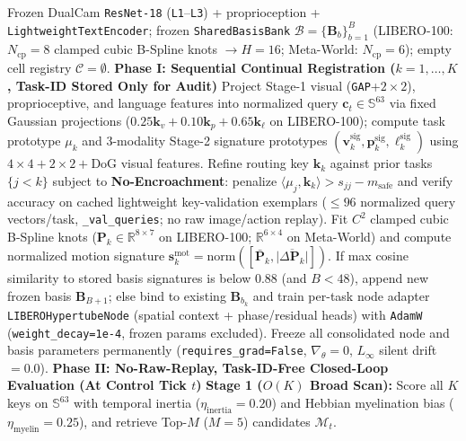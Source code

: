 \documentclass[10pt]{article}
\begin{document}
\begin{algorithm}[ht!]
\caption{\textbf{DTRA v3.0 Training Registration \& Closed-Loop Control (LIBERO-100 Implementation)}}
\label{alg:dtra_v3}
\small
\begin{algorithmic}[1]
\Require Frozen DualCam \texttt{ResNet-18} (\texttt{L1}--\texttt{L3}) + proprioception + \texttt{LightweightTextEncoder}; frozen \texttt{SharedBasisBank} $\mathcal{B} = \{\mathbf{B}_b\}_{b=1}^{B}$ (LIBERO-100: $N_{\text{cp}}=8$ clamped cubic B-Spline knots $\to H=16$; Meta-World: $N_{\text{cp}}=6$); empty cell registry $\mathcal{C} = \emptyset$.
\Statex \textbf{Phase I: Sequential Continual Registration ($k = 1, \dots, K$, Task-ID Stored Only for Audit)}
\State Project Stage-1 visual (\texttt{GAP}+$2\times 2$), proprioceptive, and language features into normalized query $\mathbf{c}_t \in \mathbb{S}^{63}$ via fixed Gaussian projections ($0.25\mathbf{k}_v + 0.10\mathbf{k}_p + 0.65\mathbf{k}_\ell$ on LIBERO-100); compute task prototype $\mu_k$ and 3-modality Stage-2 signature prototypes $(\mathbf{v}_k^{\text{sig}}, \mathbf{p}_k^{\text{sig}}, \boldsymbol{\ell}_k^{\text{sig}})$ using $4\times 4+2\times 2+\text{DoG}$ visual features.
\State Refine routing key $\mathbf{k}_k$ against prior tasks $\{j < k\}$ subject to \textbf{No-Encroachment}: penalize $\langle \mu_j, \mathbf{k}_k \rangle > s_{jj} - m_{\text{safe}}$ and verify accuracy on cached lightweight key-validation exemplars ($\le 96$ normalized query vectors/task, \texttt{\_val\_queries}; no raw image/action replay).
\State Fit $C^2$ clamped cubic B-Spline knots ($\mathbf{P}_k \in \mathbb{R}^{8\times 7}$ on LIBERO-100; $\mathbb{R}^{6\times 4}$ on Meta-World) and compute normalized motion signature $\mathbf{s}_k^{\text{mot}} = \mathrm{norm}([\bar{\mathbf{P}}_k, \overline{|\Delta\mathbf{P}_k|}])$. If max cosine similarity to stored basis signatures is below $0.88$ (and $B < 48$), append new frozen basis $\mathbf{B}_{B+1}$; else bind to existing $\mathbf{B}_{b_k}$ and train per-task node adapter \texttt{LIBEROHypertubeNode} (spatial context + phase/residual heads) with \texttt{AdamW} (\texttt{weight\_decay=1e-4}, frozen params excluded).
\State Freeze all consolidated node and basis parameters permanently (\texttt{requires\_grad=False}, $\nabla_\theta = 0$, $L_\infty$ silent drift $= 0.0$).
\Statex \textbf{Phase II: No-Raw-Replay, Task-ID-Free Closed-Loop Evaluation (At Control Tick $t$)}
\State \textbf{Stage 1 ($O(K)$ Broad Scan):} Score all $K$ keys on $\mathbb{S}^{63}$ with temporal inertia ($\eta_{\text{inertia}}=0.20$) and Hebbian myelination bias ($\eta_{\text{myelin}}=0.25$), and retrieve Top-$M$ ($M=5$) candidates $\mathcal{M}_t$.

\end{algorithmic}
\end{algorithm}
\end{document}
